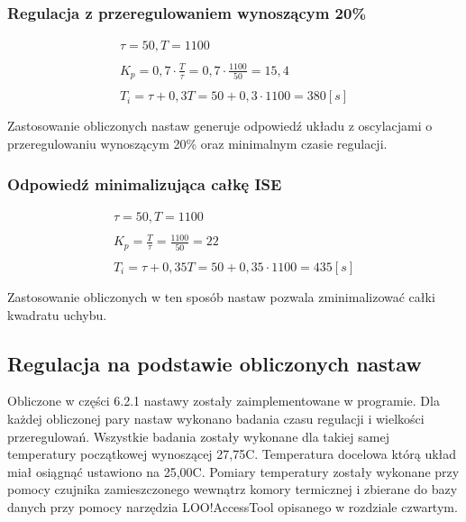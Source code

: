 \documentclass[oneside]{mgr}
\begin{document}
\subsubsection{Regulacja z przeregulowaniem wynoszącym 20\%}
    \begin{equation*}
    \begin{array}{c}
     \tau = 50, T = 1100 \\ \\
    K_{p} = 0,7 \cdot \frac{T}{\tau} = 0,7 \cdot \frac{1100}{50} = 15,4 \\ \\
    T_{i} = \tau + 0,3T = 50 + 0,3 \cdot 1100 = 380[s]\\ \\
    \end{array}
    \end{equation*}
    Zastosowanie obliczonych nastaw generuje odpowiedź układu z oscylacjami o przeregulowaniu wynoszącym 20\% oraz minimalnym czasie regulacji.
\subsubsection{Odpowiedź minimalizująca całkę ISE}
    \begin{equation*}
    \begin{array}{c}
     \tau = 50, T = 1100 \\ \\
    K_{p} = \frac{T}{\tau} = \frac{1100}{50} = 22 \\ \\
    T_{i} = \tau + 0,35T = 50 + 0,35 \cdot 1100 = 435[s]\\ \\
    \end{array}
    \end{equation*}
    Zastosowanie obliczonych w ten sposób nastaw pozwala zminimalizować całki kwadratu uchybu.


\subsection{Regulacja na podstawie obliczonych nastaw}
Obliczone w części 6.2.1 nastawy zostały zaimplementowane w programie. Dla każdej obliczonej pary nastaw wykonano badania czasu regulacji i wielkości przeregulowań. Wszystkie badania zostały wykonane dla takiej samej temperatury początkowej wynoszącej 27,75\textdegree{}C. Temperatura docelowa którą układ miał osiągnąć ustawiono na 25,00\textdegree{}C. Pomiary temperatury zostały wykonane przy pomocy czujnika zamieszczonego wewnątrz komory termicznej i zbierane do bazy danych przy pomocy narzędzia LOO!AccessTool opisanego w rozdziale czwartym.
\end{document}
